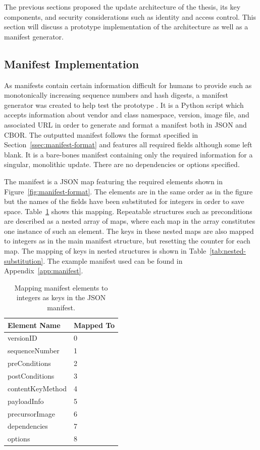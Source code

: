 \documentclass[0-thesis.tex]{subfiles}
\begin{document}
The previous sections proposed the update architecture of the thesis, its key components,
and security considerations such as identity and access control. This section will discuss
a prototype implementation of the architecture as well as a manifest generator. 

\subsection{Manifest Implementation}
\label{ssec:manifest-implementation}
As manifests contain certain information difficult for humans to provide such as
monotonically increasing sequence numbers and hash digests, a manifest generator was
created to help test the prototype \parencite{manifest-generator}. It is a Python script
which accepts information about vendor and class namespace, version, image file, and
associated URL in order to generate and format a manifest both in JSON and CBOR. The
outputted manifest follows the format specified in Section~\ref{ssec:manifest-format} and
features all required fields although some left blank. It is a bare-bones manifest
containing only the required information for a singular, monolithic update. There are no
dependencies or options specified.

The manifest is a JSON map featuring the required elements shown in
Figure~\ref{fig:manifest-format}. The elements are in the same order as in the figure but
the names of the fields have been substituted for integers in order to save space.
Table~\ref{tab:manifest-substitution} shows this mapping. Repeatable structures such as
preconditions are described as a nested array of maps, where each map in the array
constitutes one instance of such an element. The keys in these nested maps are also mapped
to integers as in the main manifest structure, but resetting the counter for each map. The
mapping of keys in nested structures is shown in Table~\ref{tab:nested-substitution}. The
example manifest used can be found in Appendix~\ref{app:manifest}. 

\begin{longtable}[]{@{}ll@{}}
    \caption{Mapping manifest elements to integers as keys in the JSON manifest.}
    \label{tab:manifest-substitution}\\
    \toprule
    Element Name & Mapped To\tabularnewline
    \midrule
    \endhead
    versionID & 0\tabularnewline
    sequenceNumber & 1\tabularnewline
    preConditions & 2\tabularnewline
    postConditions & 3\tabularnewline
    contentKeyMethod & 4\tabularnewline
    payloadInfo & 5\tabularnewline
    precursorImage & 6\tabularnewline
    dependencies & 7\tabularnewline
    options & 8\tabularnewline
    \bottomrule
\end{longtable}
\end{document}
